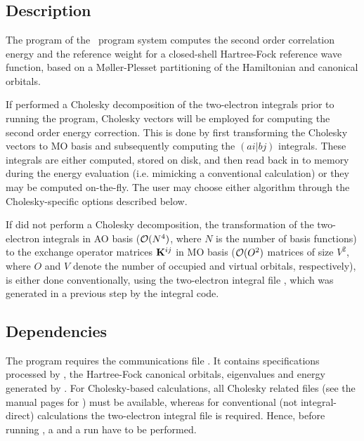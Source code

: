 
\section{}
\label{UG:sec:mbpt2}

\subsection{Description}
\label{UG:sec:mbpt2_description}
The  program of the \molcas\ program system computes
the second order correlation energy and the reference weight for a
closed-{}shell Hartree-Fock reference wave function, based on a
M{\o}ller-Plesset partitioning of the Hamiltonian and canonical orbitals.

If  performed a Cholesky decomposition of the two-electron integrals prior to running
the  program, Cholesky vectors will be employed for computing
the second order energy correction. This is done by first transforming the
Cholesky vectors to MO basis and subsequently computing the $(ai|bj)$ integrals.
These integrals are either computed, stored on disk, and then read back in to
memory during the energy evaluation (i.e. mimicking a conventional calculation)
or they may be computed on-the-fly. The user may choose either algorithm
through the Cholesky-specific options described below.

If  did not perform a Cholesky decomposition,
the transformation of the two-{}electron integrals in AO basis
(${\cal O}(N^4)$, where $N$ is the number of basis functions)
to the exchange operator matrices ${\bf K}^{ij}$ in MO basis
(${\cal O}(O^2)$ matrices of size $V^2$, where $O$ and $V$ denote the number
of occupied and virtual orbitals, respectively), is either done
conventionally, using the two-{}electron integral file , which
was generated in a previous step by the  integral code.

\subsection{Dependencies}
\label{UG:sec:mbpt2_dependencies}
The  program requires the communications file .
It contains specifications processed by ,
the Hartree-Fock canonical orbitals, eigenvalues and energy generated
by .
For Cholesky-based calculations, all Cholesky related files (see the
manual pages for ) must be available, whereas
for conventional (not integral-direct) calculations
the two-{}electron integral file 
is required. Hence, before running , a 
and a  run have to be performed.

